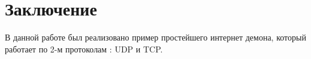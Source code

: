 ﻿\section{Заключение}
	В данной работе был реализовано пример простейшего интернет демона, который работает по 2-м протоколам : UDP и TCP.
\endinput
